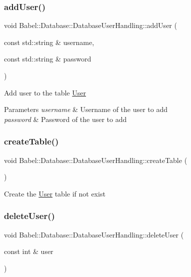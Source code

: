 \subsubsection{\texorpdfstring{add\+User()}{addUser()}}
{\footnotesize\ttfamily void Babel\+::\+Database\+::\+Database\+User\+Handling\+::add\+User (\begin{DoxyParamCaption}\item[{const std\+::string \&}]{username,  }\item[{const std\+::string \&}]{password }\end{DoxyParamCaption})}

Add user to the table \hyperlink{classUser}{User} 
\begin{DoxyParams}{Parameters}
{\em username} & Username of the user to add \\
\hline
{\em password} & Password of the user to add \\
\hline
\end{DoxyParams}
\mbox{\label{classBabel_1_1Database_1_1DatabaseUserHandling_a40d154b5566be2fbe256b73bb4b1298b}} 
\subsubsection{\texorpdfstring{create\+Table()}{createTable()}}
{\footnotesize\ttfamily void Babel\+::\+Database\+::\+Database\+User\+Handling\+::create\+Table (\begin{DoxyParamCaption}{ }\end{DoxyParamCaption})}

Create the \hyperlink{classUser}{User} table if not exist \mbox{\label{classBabel_1_1Database_1_1DatabaseUserHandling_aa50ebfb9d50954f228772f0a9132aabb}} 
\subsubsection{\texorpdfstring{delete\+User()}{deleteUser()}}
{\footnotesize\ttfamily void Babel\+::\+Database\+::\+Database\+User\+Handling\+::delete\+User (\begin{DoxyParamCaption}\item[{const int \&}]{user }\end{DoxyParamCaption})}

